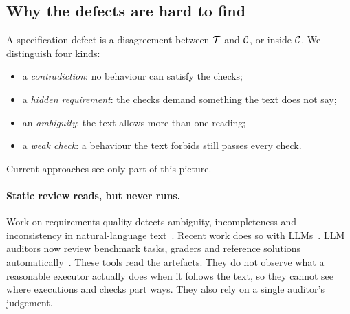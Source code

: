\subsection{Why the defects are hard to find}

A specification defect is a disagreement between $\mathcal{T}$ and $\mathcal{C}$, or inside $\mathcal{C}$. We distinguish four kinds:
\begin{itemize}[leftmargin=*]
\item a \emph{contradiction}: no behaviour can satisfy the checks;
\item a \emph{hidden requirement}: the checks demand something the text does not say;
\item an \emph{ambiguity}: the text allows more than one reading;
\item a \emph{weak check}: a behaviour the text forbids still passes every check.
\end{itemize}
Current approaches see only part of this picture.

\paragraph{Static review reads, but never runs.} Work on requirements quality detects ambiguity, incompleteness and inconsistency in natural-language text~\cite{berry2003contract,chantree2006identifying,femmer2017rapid,gervasi2005reasoning}. Recent work does so with LLMs~\cite{fantechi2023inconsistency,gartner2024automated,hall2026neurosymbolic}. LLM auditors now review benchmark tasks, graders and reference solutions automatically~\cite{tu2026who,wang2026automated,suh2026agentsuite,mohl2026automated}. These tools read the artefacts. They do not observe what a reasonable executor actually does when it follows the text, so they cannot see where executions and checks part ways. They also rely on a single auditor's judgement.

